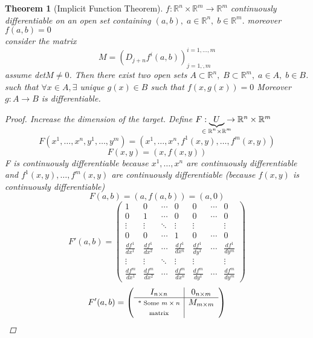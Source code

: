 \documentclass[11pt]{article}
\def\RR{\mathbb{R}}
\newtheorem{theorem}{Theorem}[section]
\begin{document}
\begin{theorem}[Implicit Function Theorem]\label{implicitFunction}
$f:\RR^n \times \RR^m \rightarrow \RR^m$ continuously differentiable on an open set containing $(a,b), \; a \in \RR^n , \; b \in \RR^m.$ moreover $f(a,b)=0$\\
consider the matrix \[M=(D_{j+n}f^{i}(a,b))^{i=1,\dots,m}_{j=1,\dot,m}\] assume det$M \neq 0$. Then there exist two open sets $A \subset \RR^n, \; B \subset \RR^m, \; a \in A, \; b \in B$. such that $\forall x \in A, \exists$ unique $g(x) \in B$ such that $f(x,g(x))=0$ Moreover $g:A \rightarrow B$ is differentiable.
\begin{proof} 
Increase the dimension of the target. Define $F:\underbrace{U}_{\mathclap{\in \;  \RR^n \times \RR^m}} \rightarrow \RR^n \times \RR^m$
\[F(x^1,\dots , x^n,y^1, \dots,y^m) = (x^1, \dots , x^n, f^1(x,y), \dots , f^m(x,y))\]
\[F(x,y) = (x,f(x,y))\]
F is continuously differentiable because $x^1 , \dots , x^n$ are continuously differentiable and $f^1(x,y), \dots , f^m(x,y)$ are continuously differentiable (because $f(x,y)$ is continuously differentiable)
\[F(a,b) = (a,f(a,b)) = (a,0)\]
\[
 F'(a,b) =
 \left( \begin{array}{cccc|ccc}
 1 & 0 & \cdots & 0 & 0 & \cdots & 0 \\
0 & 1 & \cdots & 0 & 0 & \cdots & 0 \\
  \vdots  & \vdots  & \ddots & \vdots & \vdots & & \vdots \\
0 & 0 & \cdots & 1 & 0 & \cdots & 0 \\
\hline
  \frac{df^1}{dx^1} & \frac{df^1}{dx^2}& \cdots &\frac{df^1}{dx^n} & \frac{df^1}{dy^1} & \cdots & \frac{df^1}{dy^m}\\
\vdots  & \vdots  & \ddots & \vdots & \vdots & & \vdots \\
  \frac{df^m}{dx^1} & \frac{df^m}{dx^2}& \cdots &\frac{df^m}{dx^n} & \frac{df^m}{dy^1} & \cdots & \frac{df^m}{dy^m}
 \end{array} \right)
\]
\[ F'(a,b) =
 \left( \begin{array}{c|c}
 I_{n \times n} & 0_{n \times m}\\
\hline
\text{\scriptsize * Some $m \times n$} & M_{m \times m}\\
\text{\scriptsize matrix} & 
 \end{array} \right) \]


\end{proof}
\end{theorem}
\end{document}
